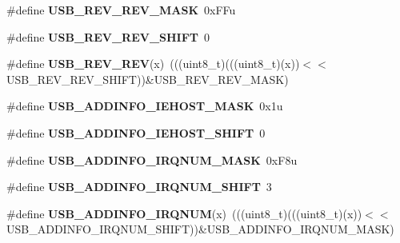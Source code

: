 \begin{DoxyCompactItemize}
\item 
\#define {\bfseries U\+S\+B\+\_\+\+R\+E\+V\+\_\+\+R\+E\+V\+\_\+\+M\+A\+SK}~0x\+F\+Fu\hypertarget{group__USB__Register__Masks_ga72a356a066674e41e3827b0ccb931e71}{}\label{group__USB__Register__Masks_ga72a356a066674e41e3827b0ccb931e71}

\item 
\#define {\bfseries U\+S\+B\+\_\+\+R\+E\+V\+\_\+\+R\+E\+V\+\_\+\+S\+H\+I\+FT}~0\hypertarget{group__USB__Register__Masks_gab058ebe4be52454e46ef15ce015ac5fd}{}\label{group__USB__Register__Masks_gab058ebe4be52454e46ef15ce015ac5fd}

\item 
\#define {\bfseries U\+S\+B\+\_\+\+R\+E\+V\+\_\+\+R\+EV}(x)~(((uint8\+\_\+t)(((uint8\+\_\+t)(x))$<$$<$U\+S\+B\+\_\+\+R\+E\+V\+\_\+\+R\+E\+V\+\_\+\+S\+H\+I\+FT))\&U\+S\+B\+\_\+\+R\+E\+V\+\_\+\+R\+E\+V\+\_\+\+M\+A\+SK)\hypertarget{group__USB__Register__Masks_ga30e7698a3bfac84ce89aee7d2d0498f4}{}\label{group__USB__Register__Masks_ga30e7698a3bfac84ce89aee7d2d0498f4}

\item 
\#define {\bfseries U\+S\+B\+\_\+\+A\+D\+D\+I\+N\+F\+O\+\_\+\+I\+E\+H\+O\+S\+T\+\_\+\+M\+A\+SK}~0x1u\hypertarget{group__USB__Register__Masks_gacb7c792034c73c4861bc8fba6ff4314f}{}\label{group__USB__Register__Masks_gacb7c792034c73c4861bc8fba6ff4314f}

\item 
\#define {\bfseries U\+S\+B\+\_\+\+A\+D\+D\+I\+N\+F\+O\+\_\+\+I\+E\+H\+O\+S\+T\+\_\+\+S\+H\+I\+FT}~0\hypertarget{group__USB__Register__Masks_gad256dcdfe8443877169b69dbcc8a041e}{}\label{group__USB__Register__Masks_gad256dcdfe8443877169b69dbcc8a041e}

\item 
\#define {\bfseries U\+S\+B\+\_\+\+A\+D\+D\+I\+N\+F\+O\+\_\+\+I\+R\+Q\+N\+U\+M\+\_\+\+M\+A\+SK}~0x\+F8u\hypertarget{group__USB__Register__Masks_gaa578584bfaf89e26213e6ba12e5f4b0e}{}\label{group__USB__Register__Masks_gaa578584bfaf89e26213e6ba12e5f4b0e}

\item 
\#define {\bfseries U\+S\+B\+\_\+\+A\+D\+D\+I\+N\+F\+O\+\_\+\+I\+R\+Q\+N\+U\+M\+\_\+\+S\+H\+I\+FT}~3\hypertarget{group__USB__Register__Masks_ga3332243caa9e2f9cfc49b031ac54cbda}{}\label{group__USB__Register__Masks_ga3332243caa9e2f9cfc49b031ac54cbda}

\item 
\#define {\bfseries U\+S\+B\+\_\+\+A\+D\+D\+I\+N\+F\+O\+\_\+\+I\+R\+Q\+N\+UM}(x)~(((uint8\+\_\+t)(((uint8\+\_\+t)(x))$<$$<$U\+S\+B\+\_\+\+A\+D\+D\+I\+N\+F\+O\+\_\+\+I\+R\+Q\+N\+U\+M\+\_\+\+S\+H\+I\+FT))\&U\+S\+B\+\_\+\+A\+D\+D\+I\+N\+F\+O\+\_\+\+I\+R\+Q\+N\+U\+M\+\_\+\+M\+A\+SK)\hypertarget{group__USB__Register__Masks_ga0ab998135e9b4c5e89fa598b54bf96a3}{}\label{group__USB__Register__Masks_ga0ab998135e9b4c5e89fa598b54bf96a3}


\end{DoxyCompactItemize}
